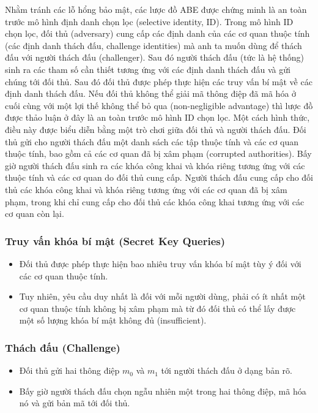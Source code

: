 Nhằm tránh các lỗ hổng bảo mật, các lược đồ ABE được chứng minh là an toàn trước mô hình định danh chọn lọc (selective identity, ID). Trong mô hình ID chọn lọc, đối thủ (adversary) cung cấp các định danh của các cơ quan thuộc tính (các định danh thách đấu, challenge identities) mà anh ta muốn dùng để thách đấu với người thách đấu (challenger). Sau đó người thách đấu (tức là hệ thống) sinh ra các tham số cần thiết tương ứng với các định danh thách đấu và gửi chúng tới đối thủ. Sau đó đối thủ được phép thực hiện các truy vấn bí mật về các định danh thách đấu. Nếu đối thủ không thể giải mã thông điệp đã mã hóa ở cuối cùng với một lợi thế không thể bỏ qua (non-negligible advantage) thì lược đồ được thảo luận ở đây là an toàn trước mô hình ID chọn lọc. Một cách hình thức, điều này được biểu diễn bằng một trò chơi giữa đối thủ và người thách đấu. Đối thủ gửi cho người thách đấu một danh sách các tập thuộc tính và các cơ quan thuộc tính, bao gồm cả các cơ quan đã bị xâm phạm (corrupted authorities). Bấy giờ người thách đấu sinh ra các khóa công khai và khóa riêng tương ứng với các thuộc tính và các cơ quan do đối thủ cung cấp. Người thách đấu cung cấp cho đối thủ các khóa công khai và khóa riêng tương ứng với các cơ quan đã bị xâm phạm, trong khi chỉ cung cấp cho đối thủ các khóa công khai tương ứng với các cơ quan còn lại.

\subsubsection*{Truy vấn khóa bí mật (Secret Key Queries)}
\begin{itemize}
  \item Đối thủ được phép thực hiện bao nhiêu truy vấn khóa bí mật tùy ý đối với các cơ quan thuộc tính.
  \item Tuy nhiên, yêu cầu duy nhất là đối với mỗi người dùng, phải có ít nhất một cơ quan thuộc tính không bị xâm phạm mà từ đó đối thủ có thể lấy được một số lượng khóa bí mật không đủ (insufficient).
\end{itemize}

\subsubsection*{Thách đấu (Challenge)}
\begin{itemize}
  \item Đối thủ gửi hai thông điệp $m_0$ và $m_1$ tới người thách đấu ở dạng bản rõ.
  \item Bấy giờ người thách đấu chọn ngẫu nhiên một trong hai thông điệp, mã hóa nó và gửi bản mã tới đối thủ.
\end{itemize}

